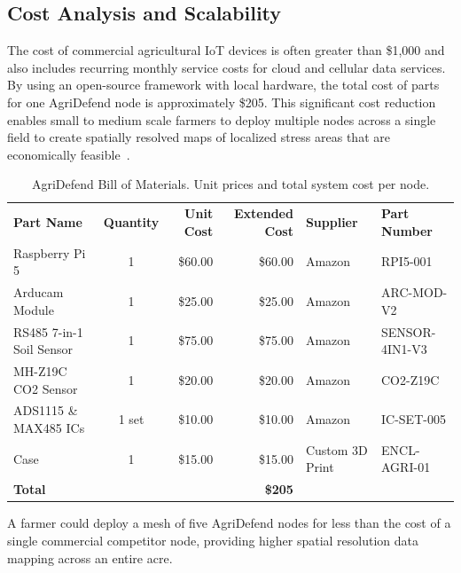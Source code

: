 \documentclass[10pt,twocolumn]{article}
\begin{document}
\subsection{Cost Analysis and Scalability}
The cost of commercial agricultural IoT devices is often greater than \$1,000 and also includes recurring monthly service costs for cloud and cellular data services.
By using an open-source framework with local hardware, the total cost of parts for one AgriDefend node is approximately \$205.
This significant cost reduction enables small to medium scale farmers to deploy multiple nodes across a single field to create spatially resolved maps of localized stress areas that are economically feasible~\cite{ref19}.

\begin{table}[htbp]
    \centering
    \caption{AgriDefend Bill of Materials. Unit prices and total system cost per node.}
    \label{tab:1}
    \renewcommand{\arraystretch}{1.3}
    \setlength{\tabcolsep}{6pt}
    \begin{tabular}{p{1.8in} c r r l l}
    \toprule
    \rowcolor{hdrblue}
    \color{white}\textbf{Part Name} &
    \color{white}\textbf{Quantity} &
    \color{white}\textbf{Unit Cost} &
    \color{white}\textbf{Extended Cost} &
    \color{white}\textbf{Supplier} &
    \color{white}\textbf{Part Number}\\
    \rowcolor{rowalpha}
    Raspberry Pi 5 & 1 & \$60.00 & \$60.00 & Amazon & RPI5-001 \\
    Arducam Module & 1 & \$25.00 & \$25.00 & Amazon & ARC-MOD-V2 \\
    \rowcolor{rowalpha}
    RS485 7-in-1 Soil Sensor & 1 & \$75.00 & \$75.00 & Amazon & SENSOR-4IN1-V3 \\
    MH-Z19C CO2 Sensor & 1 & \$20.00 & \$20.00 & Amazon & CO2-Z19C \\
    \rowcolor{rowalpha}
    ADS1115 \& MAX485 ICs & 1 set & \$10.00 & \$10.00 & Amazon & IC-SET-005 \\
    Case & 1 & \$15.00 & \$15.00 & Custom 3D Print & ENCL-AGRI-01 \\ \midrule
    \textbf{Total} & & & \textbf{\$205} & & \\
    \bottomrule
    \end{tabular}
\end{table}

A farmer could deploy a mesh of five AgriDefend nodes for less than the cost of a single commercial competitor node, providing higher spatial resolution data mapping across an entire acre.
\end{document}

